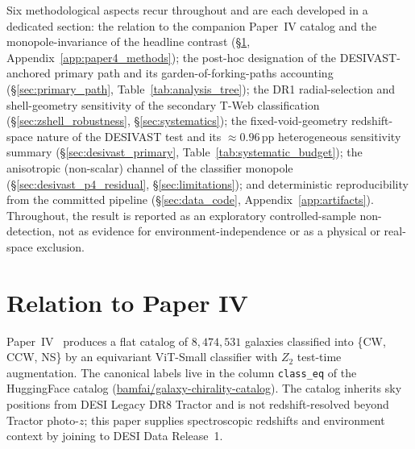 \documentclass[aps,prd,twocolumn,superscriptaddress,showpacs,preprintnumbers,nofootinbib,longbibliography,floatfix]{revtex4-2}
\begin{document}
Six methodological aspects recur throughout and are each developed in a
dedicated section: the relation to the companion Paper~IV catalog and the
monopole-invariance of the headline contrast (\S\ref{sec:p4},
Appendix~\ref{app:paper4_methods}); the post-hoc designation of the
DESIVAST-anchored primary path and its garden-of-forking-paths accounting
(\S\ref{sec:primary_path}, Table~\ref{tab:analysis_tree}); the DR1
radial-selection and shell-geometry sensitivity of the secondary T-Web
classification (\S\ref{sec:zshell_robustness}, \S\ref{sec:systematics});
the fixed-void-geometry redshift-space nature of the DESIVAST test and its
${\approx}0.96$\,pp heterogeneous sensitivity summary (\S\ref{sec:desivast_primary},
Table~\ref{tab:systematic_budget}); the anisotropic (non-scalar) channel of
the classifier monopole (\S\ref{sec:desivast_p4_residual},
\S\ref{sec:limitations}); and deterministic reproducibility from the
committed pipeline (\S\ref{sec:data_code}, Appendix~\ref{app:artifacts}).
Throughout, the result is reported as an exploratory controlled-sample
non-detection, not as evidence for environment-independence or as a
physical or real-space exclusion.

\section{Relation to Paper IV}\label{sec:p4}

Paper~IV~\cite{golden_chirality_2026} produces a flat catalog of
$8{,}474{,}531$ galaxies classified into \{CW, CCW, NS\} by an
equivariant ViT-Small classifier with $Z_2$ test-time augmentation.
The canonical labels live in the column \texttt{class\_eq} of the
HuggingFace catalog
(\href{https://huggingface.co/datasets/bamfai/galaxy-chirality-catalog}%
{bamfai/galaxy-chirality-catalog}). The catalog inherits sky positions from
DESI Legacy DR8 Tractor and is not redshift-resolved beyond Tractor
photo-$z$; this paper supplies spectroscopic redshifts and environment
context by joining to DESI Data Release~1.
\end{document}
